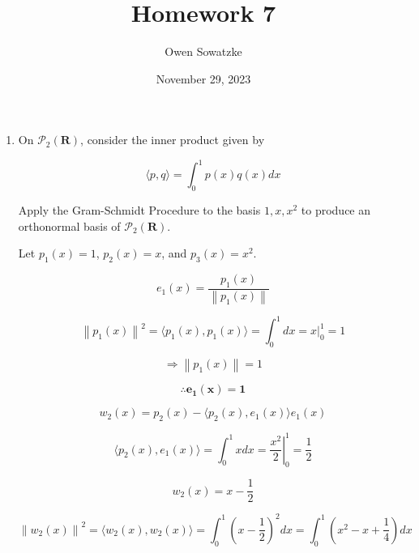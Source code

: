 \documentclass[fleqn]{article}
\title{Homework 7}
\author{Owen Sowatzke}
\date{November 29, 2023}
\newcommand{\zerodisplayskip}{
	\setlength{\abovedisplayskip}{0pt}%
	\setlength{\belowdisplayskip}{0pt}%
	\setlength{\abovedisplayshortskip}{0pt}%
	\setlength{\belowdisplayshortskip}{0pt}%
	\setlength{\mathindent}{0pt}}
\newcommand{\norm}[1]{\left \lVert #1 \right \rVert}
\begin{document}
	\offinterlineskip
	\setlength{\lineskip}{12pt}
	\zerodisplayskip
	\maketitle
	
	\begin{enumerate}[nolistsep]
		\item On $\mathcal{P}_2(\mathbf{R})$, consider the inner product given by
		
		\begin{equation*}
			\langle p, q \rangle = \int_{0}^{1}{p(x)q(x)dx}
		\end{equation*}
		
		Apply the Gram-Schmidt Procedure to the basis $1, x, x^2$ to produce an orthonormal basis of $\mathcal{P}_2(\mathbf{R})$.
		
		Let $p_1(x) = 1$, $p_2(x) = x$, and $p_3(x) = x^2$.
		
		\begin{equation*}
			e_1(x) = \frac{p_1(x)}{\norm{p_1(x)}}
		\end{equation*}  
		
		\begin{equation*}
			\norm{p_1(x)}^2 = \langle p_1(x), p_1(x) \rangle = \int_{0}^{1}{dx} = \left.x\right\vert_{0}^{1} = 1
		\end{equation*}
		
		\begin{equation*}
			\Rightarrow \norm{p_1(x)} = 1			
		\end{equation*}
		
		\begin{equation*}
			\mathbf{\therefore e_1(x) = 1}
		\end{equation*}
		
		\begin{equation*}
			w_2(x) = p_2(x) - \langle p_2(x), e_1(x) \rangle e_1(x)
		\end{equation*}
		
		\begin{equation*}
			\langle p_2(x), e_1(x) \rangle = \int_{0}^{1}{x dx} = \left.\frac{x^2}{2}\right\vert_{0}^{1} = \frac{1}{2}
		\end{equation*}
		
		\begin{equation*}
			w_2(x) = x - \frac{1}{2}
		\end{equation*}
		
		\begin{equation*}
			\norm{w_2(x)}^2 = \langle w_2(x), w_2(x) \rangle = \int_{0}^{1}{\left(x - \frac{1}{2}\right)^{2}dx} = \int_{0}^{1}{\left(x^{2} - x + \frac{1}{4}\right)dx}
		\end{equation*}
		

\end{enumerate}
\end{document}
